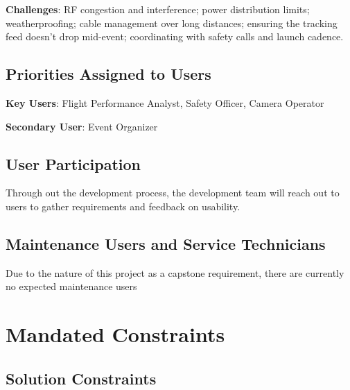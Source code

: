 \documentclass[12pt]{article}
\begin{document}
\textbf{Challenges}: RF congestion and interference; power distribution limits; weatherproofing; cable management over long distances; ensuring the tracking feed doesn’t drop mid-event; coordinating with safety calls and launch cadence.

\subsection{Priorities Assigned to Users}

\textbf{Key Users}: Flight Performance Analyst, Safety Officer, Camera Operator

\textbf{Secondary User}: Event Organizer

\subsection{User Participation}

Through out the development process, the development team will reach out to
users to gather requirements and feedback on usability.

\subsection{Maintenance Users and Service Technicians}

Due to the nature of this project as a capstone requirement, there are
currently no expected maintenance users

\section{Mandated Constraints}
\subsection{Solution Constraints}
\end{document}
